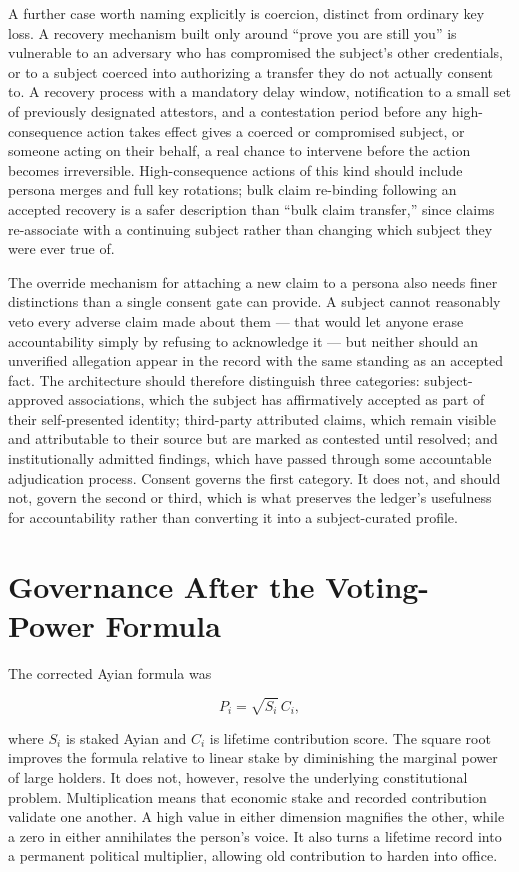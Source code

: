 \documentclass[11pt,oneside]{article}
\theoremstyle{plain}
\theoremstyle{definition}
\begin{document}
A further case worth naming explicitly is coercion, distinct from ordinary key loss. A recovery mechanism built only around \enquote{prove you are still you} is vulnerable to an adversary who has compromised the subject's other credentials, or to a subject coerced into authorizing a transfer they do not actually consent to. A recovery process with a mandatory delay window, notification to a small set of previously designated attestors, and a contestation period before any high-consequence action takes effect gives a coerced or compromised subject, or someone acting on their behalf, a real chance to intervene before the action becomes irreversible. High-consequence actions of this kind should include persona merges and full key rotations; bulk claim re-binding following an accepted recovery is a safer description than \enquote{bulk claim transfer,} since claims re-associate with a continuing subject rather than changing which subject they were ever true of.

The override mechanism for attaching a new claim to a persona also needs finer distinctions than a single consent gate can provide. A subject cannot reasonably veto every adverse claim made about them --- that would let anyone erase accountability simply by refusing to acknowledge it --- but neither should an unverified allegation appear in the record with the same standing as an accepted fact. The architecture should therefore distinguish three categories: subject-approved associations, which the subject has affirmatively accepted as part of their self-presented identity; third-party attributed claims, which remain visible and attributable to their source but are marked as contested until resolved; and institutionally admitted findings, which have passed through some accountable adjudication process. Consent governs the first category. It does not, and should not, govern the second or third, which is what preserves the ledger's usefulness for accountability rather than converting it into a subject-curated profile.

\section{Governance After the Voting-Power Formula}

The corrected Ayian formula was

\begin{equation}
P_i = \sqrt{S_i}\,C_i,
\end{equation}

where $S_i$ is staked Ayian and $C_i$ is lifetime contribution score. The square root improves the formula relative to linear stake by diminishing the marginal power of large holders. It does not, however, resolve the underlying constitutional problem. Multiplication means that economic stake and recorded contribution validate one another. A high value in either dimension magnifies the other, while a zero in either annihilates the person's voice. It also turns a lifetime record into a permanent political multiplier, allowing old contribution to harden into office.
\end{document}
